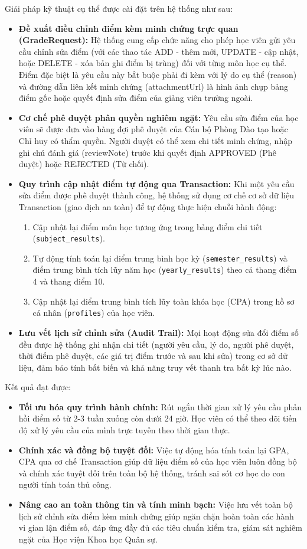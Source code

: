 \documentclass[../DoAn.tex]{subfiles}
\begin{document}
Giải pháp kỹ thuật cụ thể được cài đặt trên hệ thống như sau:
\begin{itemize}
    \item \textbf{Đề xuất điều chỉnh điểm kèm minh chứng trực quan (GradeRequest):} Hệ thống cung cấp chức năng cho phép học viên gửi yêu cầu chỉnh sửa điểm (với các thao tác ADD - thêm mới, UPDATE - cập nhật, hoặc DELETE - xóa bản ghi điểm bị trùng) đối với từng môn học cụ thể. Điểm đặc biệt là yêu cầu này bắt buộc phải đi kèm với lý do cụ thể (reason) và đường dẫn liên kết minh chứng (attachmentUrl) là hình ảnh chụp bảng điểm gốc hoặc quyết định sửa điểm của giảng viên trường ngoài.
    \item \textbf{Cơ chế phê duyệt phân quyền nghiêm ngặt:} Yêu cầu sửa điểm của học viên sẽ được đưa vào hàng đợi phê duyệt của Cán bộ Phòng Đào tạo hoặc Chỉ huy có thẩm quyền. Người duyệt có thể xem chi tiết minh chứng, nhập ghi chú đánh giá (reviewNote) trước khi quyết định APPROVED (Phê duyệt) hoặc REJECTED (Từ chối).
    \item \textbf{Quy trình cập nhật điểm tự động qua Transaction:} Khi một yêu cầu sửa điểm được phê duyệt thành công, hệ thống sử dụng cơ chế cơ sở dữ liệu Transaction (giao dịch an toàn) để tự động thực hiện chuỗi hành động:
    \begin{enumerate}
        \item Cập nhật lại điểm môn học tương ứng trong bảng điểm chi tiết (\texttt{subject\_results}).
        \item Tự động tính toán lại điểm trung bình học kỳ (\texttt{semester\_results}) và điểm trung bình tích lũy năm học (\texttt{yearly\_results}) theo cả thang điểm 4 và thang điểm 10.
        \item Cập nhật lại điểm trung bình tích lũy toàn khóa học (CPA) trong hồ sơ cá nhân (\texttt{profiles}) của học viên.
    \end{enumerate}
    \item \textbf{Lưu vết lịch sử chỉnh sửa (Audit Trail):} Mọi hoạt động sửa đổi điểm số đều được hệ thống ghi nhận chi tiết (người yêu cầu, lý do, người phê duyệt, thời điểm phê duyệt, các giá trị điểm trước và sau khi sửa) trong cơ sở dữ liệu, đảm bảo tính bất biến và khả năng truy vết thanh tra bất kỳ lúc nào.
\end{itemize}

Kết quả đạt được:
\begin{itemize}
    \item \textbf{Tối ưu hóa quy trình hành chính:} Rút ngắn thời gian xử lý yêu cầu phản hồi điểm số từ 2-3 tuần xuống còn dưới 24 giờ. Học viên có thể theo dõi tiến độ xử lý yêu cầu của mình trực tuyến theo thời gian thực.
    \item \textbf{Chính xác và đồng bộ tuyệt đối:} Việc tự động hóa tính toán lại GPA, CPA qua cơ chế Transaction giúp dữ liệu điểm số của học viên luôn đồng bộ và chính xác tuyệt đối trên toàn bộ hệ thống, tránh sai sót cơ học do con người tính toán thủ công.
    \item \textbf{Nâng cao an toàn thông tin và tính minh bạch:} Việc lưu vết toàn bộ lịch sử chỉnh sửa điểm kèm minh chứng giúp ngăn chặn hoàn toàn các hành vi gian lận điểm số, đáp ứng đầy đủ các tiêu chuẩn kiểm tra, giám sát nghiêm ngặt của Học viện Khoa học Quân sự.
\end{itemize}
\end{document}
